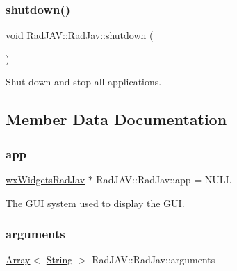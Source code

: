 \subsubsection{\texorpdfstring{shutdown()}{shutdown()}}
{\footnotesize\ttfamily void Rad\+J\+A\+V\+::\+Rad\+Jav\+::shutdown (\begin{DoxyParamCaption}{ }\end{DoxyParamCaption})\hspace{0.3cm}{\ttfamily [static]}}



Shut down and stop all applications. 



\subsection{Member Data Documentation}
\mbox{\label{class_rad_j_a_v_1_1_rad_jav_aa7084f6f5e9bfddf213a16c06878cb36}} 
\subsubsection{\texorpdfstring{app}{app}}
{\footnotesize\ttfamily \mbox{\hyperlink{class_rad_j_a_v_1_1wx_widgets_rad_jav}{wx\+Widgets\+Rad\+Jav}} $\ast$ Rad\+J\+A\+V\+::\+Rad\+Jav\+::app = N\+U\+LL\hspace{0.3cm}{\ttfamily [static]}}



The \mbox{\hyperlink{namespace_rad_j_a_v_1_1_g_u_i}{G\+UI}} system used to display the \mbox{\hyperlink{namespace_rad_j_a_v_1_1_g_u_i}{G\+UI}}. 

\mbox{\label{class_rad_j_a_v_1_1_rad_jav_a8a4b1ccb076b4ffa84b285d8c1d1e050}} 
\subsubsection{\texorpdfstring{arguments}{arguments}}
{\footnotesize\ttfamily \mbox{\hyperlink{class_rad_j_a_v_1_1_array}{Array}}$<$ \mbox{\hyperlink{class_rad_j_a_v_1_1_string}{String}} $>$ Rad\+J\+A\+V\+::\+Rad\+Jav\+::arguments\hspace{0.3cm}{\ttfamily [static]}}



